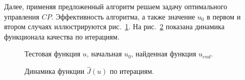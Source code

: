 \documentclass[10pt]{article}
\begin{document}
    Далее, применяя предложенный алгоритм решаем задачу оптимального управления $CP$.
    Эффективность алгоритма, а также значение $u_0$
    в первом и втором случаях иллюстрируются рис.~\ref{control}.
    На рис.~\ref{cost} показана динамика функционала качества по итерациям.

    \begin{figure}[H]
        \centering
        \caption{Тестовая функция $u$, начальная $u_0$, найденная функция $u_{end}.$}
        \label{control}
    \end{figure}

    \begin{figure}[H]
        \centering
        \caption{Динамика функции $\hat{J}(u)$ по итерациям.}
        \label{cost}
    \end{figure}


    
\end{document}
